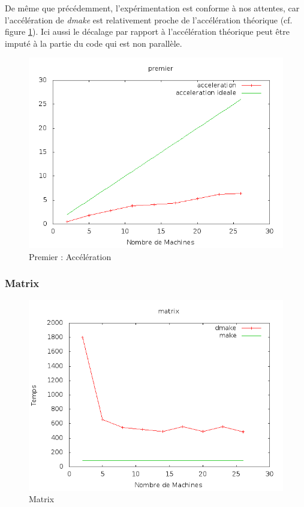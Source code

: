 \documentclass[a4paper,12pt,twoside]{article}
\begin{document}
De même que précédemment, l'expérimentation est conforme à nos attentes, car
l'accélération de \emph{dmake} est relativement proche de l'accélération
théorique (cf. figure \ref{fig:premierAcc}). Ici aussi le décalage par rapport à l'accélération théorique peut
être imputé à la partie du code qui est non parallèle. 

\begin{figure}[H]
  \centering
  \includegraphics[scale=0.5]{acceleration_premier.png}
  \caption{Premier : Accélération}
  \label{fig:premierAcc}
\end{figure}

\subsubsection{Matrix}

\begin{figure}[H]
  \centering
  \includegraphics[scale=0.5]{graph_matrix.png}
  \caption{Matrix}
  \label{fig:matrix}
\end{figure}
\end{document}
